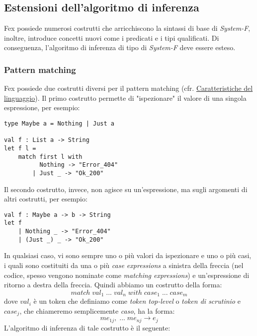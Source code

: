 \documentclass[10pt,a4paper]{article}
\begin{document}
\hypertarget{Estensioni dell'algoritmo di inferenza}{\subsection{Estensioni dell'algoritmo di inferenza}}
Fex possiede numerosi costrutti che arricchiscono la sintassi di base di \textit{System-F}, inoltre, introduce
concetti nuovi come i predicati e i tipi qualificati. Di conseguenza, l'algoritmo di inferenza di tipo di \textit{System-F}
deve essere esteso.

\hypertarget{Pattern matching}{\subsubsection{Pattern matching}}
Fex possiede due costrutti diversi per il pattern matching
(cfr. \hyperlink{Caratteristiche del linguaggio}{Caratteristiche del linguaggio}). Il primo costrutto
permette di "ispezionare" il valore di una singola espressione, per esempio:
\begin{lstlisting}
type Maybe a = Nothing | Just a

val f : List a -> String
let f l =
    match first l with
          Nothing -> "Error_404"
        | Just _ -> "Ok_200"
\end{lstlisting}
Il secondo costrutto, invece, non agisce su un'espressione, ma sugli argomenti di altri costrutti, per esempio:
\begin{lstlisting}
val f : Maybe a -> b -> String
let f
    | Nothing _ -> "Error_404"
    | (Just _) _ -> "Ok_200"
\end{lstlisting}
In qualsiasi caso, vi sono sempre uno o più valori da ispezionare e uno o più casi, i quali sono costituiti da una o più
\textit{case expressions} a sinistra della freccia (nel codice, spesso vengono nominate come \textit{matching expressions})
e un'espressione di ritorno a destra della freccia. Quindi abbiamo un costrutto della forma:
\[ match \; val_1 \; ... \; val_n \; with \; case_1 \; ... \; case_m \]
dove $ val_i $ è un token che definiamo come \textit{token top-level} o \textit{token di scrutinio} e
$ case_j $, che chiameremo semplicemente \textit{caso}, ha la forma:
\[ me_{1j}, \; ... \; me_{nj} \rightarrow e_j \]
L'algoritmo di inferenza di tale costrutto è il seguente:
\end{document}
